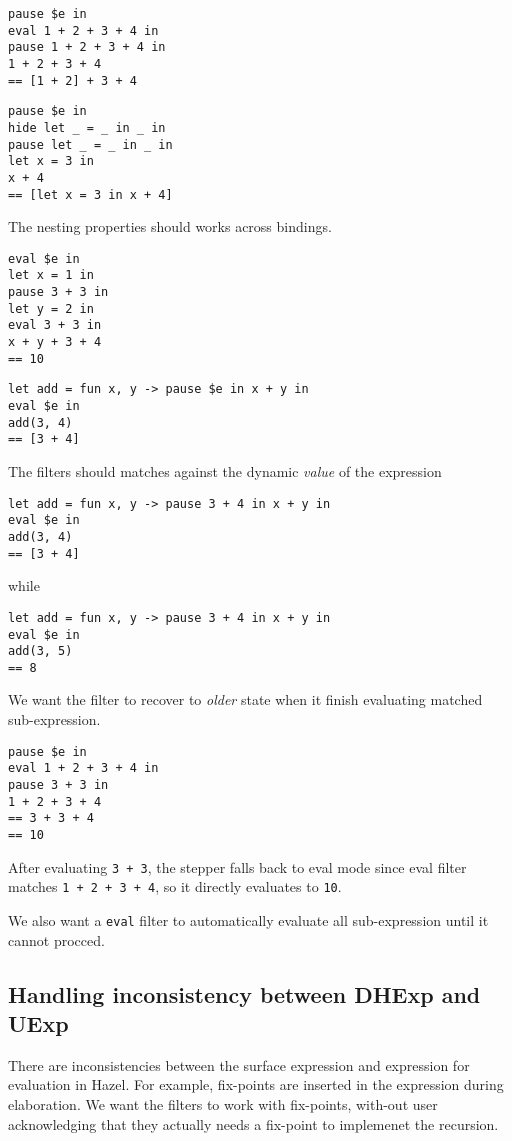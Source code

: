 \begin{verbatim}
pause $e in
eval 1 + 2 + 3 + 4 in
pause 1 + 2 + 3 + 4 in
1 + 2 + 3 + 4
== [1 + 2] + 3 + 4
\end{verbatim}

\begin{verbatim}
pause $e in
hide let _ = _ in _ in
pause let _ = _ in _ in
let x = 3 in
x + 4
== [let x = 3 in x + 4]
\end{verbatim}

The nesting properties should works across bindings.

\begin{verbatim}
eval $e in
let x = 1 in
pause 3 + 3 in
let y = 2 in
eval 3 + 3 in
x + y + 3 + 4
== 10
\end{verbatim}

\begin{verbatim}
let add = fun x, y -> pause $e in x + y in
eval $e in
add(3, 4)
== [3 + 4]
\end{verbatim}

The filters should matches against the dynamic \emph{value} of the expression

\begin{verbatim}
let add = fun x, y -> pause 3 + 4 in x + y in
eval $e in
add(3, 4)
== [3 + 4]
\end{verbatim}
while
\begin{verbatim}
let add = fun x, y -> pause 3 + 4 in x + y in
eval $e in
add(3, 5)
== 8
\end{verbatim}

We want the filter to recover to \emph{older} state when it finish
evaluating matched sub-expression.

\begin{verbatim}
pause $e in
eval 1 + 2 + 3 + 4 in
pause 3 + 3 in
1 + 2 + 3 + 4
== 3 + 3 + 4
== 10
\end{verbatim}

After evaluating \verb|3 + 3|, the stepper falls back to eval mode
since eval filter matches \verb|1 + 2 + 3 + 4|, so it directly
evaluates to \verb|10|.

We also want a \verb|eval| filter to automatically evaluate all sub-expression until it cannot procced.

\subsection{Handling inconsistency between DHExp and UExp}

There are inconsistencies between the surface expression and expression for evaluation in Hazel. For example,
fix-points are inserted in the expression during elaboration. We want the filters to work with fix-points, with-out
user acknowledging that they actually needs a fix-point to implemenet the recursion.

